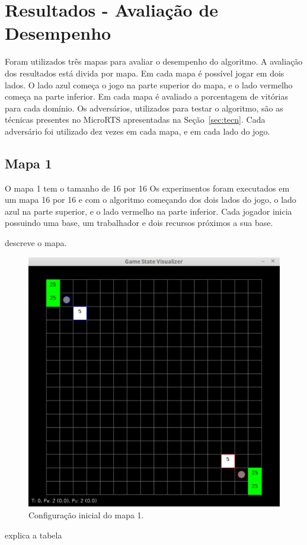 
\chapter{\label{chap:ativ}Resultados - Avaliação de Desempenho}

Foram utilizados três mapas para avaliar o desempenho do algoritmo.
A avaliação dos resultados está divida por mapa.
Em cada mapa é possível jogar em dois lados.
O lado azul começa o jogo na parte superior do mapa, e o lado vermelho começa na parte inferior.
Em cada mapa é avaliado a porcentagem de vitórias para cada domínio.
Os adversários, utilizados para testar o algoritmo, são as técnicas presentes no MicroRTS apresentadas na Seção~\ref{sec:tecn}.
Cada adversário foi utilizado dez vezes em cada mapa, e em cada lado do jogo.

\section{Mapa 1}


O mapa 1 tem o tamanho de 16 por 16
Os experimentos foram executados em um mapa 16 por 16 e com o algoritmo começando dos dois lados do jogo, o lado azul na parte superior, e o lado vermelho na parte inferior. Cada jogador inicia possuindo uma base, um trabalhador e dois recursos próximos a sua base.


descreve o mapa.

\begin{figure}[ht]
	\centering
	\includegraphics[width=.6\textwidth]{fig/map16x16.pdf}
	\caption{Configuração inicial do mapa 1.}
	\label{fig:mapa16x16}
\end{figure}


explica a tabela


